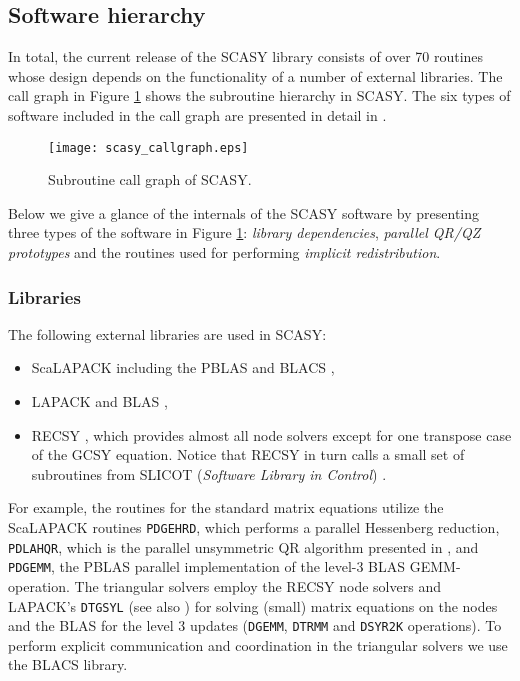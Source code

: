 \documentclass[11pt]{article}
\begin{document}
\subsection{Software hierarchy}
\label{sec:internals} In total, the current release of the SCASY
library consists of over 70 routines whose design depends on the
functionality of a number of external libraries. The call graph in
Figure \ref{fig:callgraph} shows the subroutine hierarchy in
SCASY. The six types of software included in the call graph are
presented in detail in \cite{granatkagstrom07b}. 
%
\begin{figure}
  \centering
  \caption{Subroutine call graph of SCASY.}
  \texttt{[image: scasy\_callgraph.eps]}
  \label{fig:callgraph}
\end{figure}
%
Below we give a glance of the internals of the SCASY software by 
presenting three types of the software in Figure \ref{fig:callgraph}: 
\emph{library dependencies}, \emph{parallel QR/QZ prototypes} and 
the routines used for performing \emph{implicit redistribution}.

\subsubsection{Libraries}
\label{sec:libraries} The following external libraries are used in
SCASY:
%
\begin{itemize}
    \item ScaLAPACK \cite{blackfordetal97,slug}
    including the PBLAS \cite{pblas} and BLACS \cite{blacs},
    \item LAPACK and BLAS \cite{lapack3},
    \item RECSY \cite{jonssonkagstrom03}, which provides almost
    all node solvers except for one transpose case of the GCSY
    equation. Notice that RECSY in turn calls a small
    set of subroutines from SLICOT ({\em Software Library in Control})
    \cite{slicot,slicotweb}.
\end{itemize}
%
For example, the routines for the standard matrix equations
utilize the ScaLAPACK routines \texttt{PDGEHRD}, which performs a
parallel Hessenberg reduction, \texttt{PDLAHQR}, which is the
parallel unsymmetric QR algorithm presented in
\cite{henrywatkinsdongarra02}, and \texttt{PDGEMM}, the PBLAS
parallel implementation of the level-3 BLAS GEMM-operation. The
triangular solvers employ the RECSY node solvers
\cite{jonssonkagstrom02a,jonssonkagstrom02b,jonssonkagstrom03} and
LAPACK's \texttt{DTGSYL} (see also \cite{kagstromporomaa96}) for
solving (small) matrix equations on the nodes and the BLAS for the
level 3 updates (\texttt{DGEMM}, \texttt{DTRMM} and
\texttt{DSYR2K} operations). To perform explicit communication and
coordination in the triangular solvers we use the BLACS library.
\end{document}

